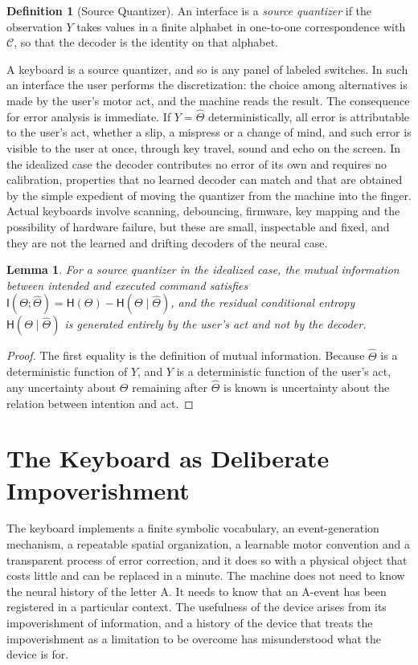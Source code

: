 \documentclass[11pt,twoside,openany]{book}
\newtheorem{lemma}[theorem]{Lemma}
\theoremstyle{definition}
\newtheorem{definition}[theorem]{Definition}
\theoremstyle{remark}
\newcommand{\C}{\mathcal{C}}
\newcommand{\MI}{\mathsf{I}}
\newcommand{\Hent}{\mathsf{H}}
\newcommand{\Th}{\Theta}
\newcommand{\Thh}{\widehat{\Theta}}
\begin{document}
\begin{definition}[Source Quantizer]
An interface is a \emph{source quantizer} if the observation $Y$ takes values in a finite alphabet in one-to-one correspondence with $\C$, so that the decoder is the identity on that alphabet.
\end{definition}

A keyboard is a source quantizer, and so is any panel of labeled switches. In such an interface the user performs the discretization: the choice among alternatives is made by the user's motor act, and the machine reads the result. The consequence for error analysis is immediate. If $Y=\Thh$ deterministically, all error is attributable to the user's act, whether a slip, a mispress or a change of mind, and such error is visible to the user at once, through key travel, sound and echo on the screen. In the idealized case the decoder contributes no error of its own and requires no calibration, properties that no learned decoder can match and that are obtained by the simple expedient of moving the quantizer from the machine into the finger. Actual keyboards involve scanning, debouncing, firmware, key mapping and the possibility of hardware failure, but these are small, inspectable and fixed, and they are not the learned and drifting decoders of the neural case.

\begin{lemma}
For a source quantizer in the idealized case, the mutual information between intended and executed command satisfies $\MI(\Th;\Thh)=\Hent(\Th)-\Hent(\Th\mid\Thh)$, and the residual conditional entropy $\Hent(\Th\mid\Thh)$ is generated entirely by the user's act and not by the decoder.
\end{lemma}
\begin{proof}
The first equality is the definition of mutual information. Because $\Thh$ is a deterministic function of $Y$, and $Y$ is a deterministic function of the user's act, any uncertainty about $\Th$ remaining after $\Thh$ is known is uncertainty about the relation between intention and act.
\end{proof}

\section{The Keyboard as Deliberate Impoverishment}

The keyboard implements a finite symbolic vocabulary, an event-generation mechanism, a repeatable spatial organization, a learnable motor convention and a transparent process of error correction, and it does so with a physical object that costs little and can be replaced in a minute. The machine does not need to know the neural history of the letter A. It needs to know that an A-event has been registered in a particular context. The usefulness of the device arises from its impoverishment of information, and a history of the device that treats the impoverishment as a limitation to be overcome has misunderstood what the device is for.
\end{document}
